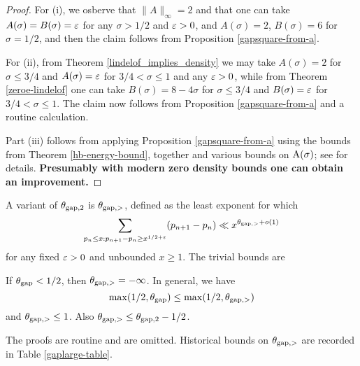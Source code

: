 \begin{proof} For (i), we osberve that $\|A\|_\infty=2$ and that one can take $A(\sigma)=B(\sigma)=\varepsilon$ for any $\sigma>1/2$ and $\varepsilon>0$, and $A(\sigma)=2$, $B(\sigma)=6$ for $\sigma=1/2$, and then the claim follows from Proposition \ref{gapsquare-from-a}.

For (ii), from Theorem \ref{lindelof_implies_density} we may take $A(\sigma)=2$ for $\sigma \leq 3/4$ and $A(\sigma)=\varepsilon$ for $3/4 < \sigma \leq 1$ and any $\varepsilon>0$, while from Theorem \ref{zeroe-lindelof} one can take $B(\sigma) = 8-4\sigma$ for $\sigma \leq 3/4$ and $B(\sigma)=\varepsilon$ for $3/4 < \sigma \leq 1$.  The claim now follows from Proposition \ref{gapsquare-from-a} and a routine calculation.

Part (iii) follows from applying Proposition \ref{gapsquare-from-a} using the bounds from Theorem \ref{hb-energy-bound}, together and various bounds on $\mathrm{A}(\sigma)$; see \cite[Theorem 12.14]{ivic} for details.  {\bf Presumably with modern zero density bounds one can obtain an improvement.}
\end{proof}

A variant of $\theta_{\mathrm{gap},2}$ is $\theta_{\mathrm{gap},>}$, defined as the least exponent for which
$$ \sum_{p_n \leq x: p_{n+1}-p_n \geq x^{1/2+\varepsilon}} (p_{n+1}-p_n) \ll x^{\theta_{\mathrm{gap},>}+o(1)}$$
for any fixed $\varepsilon>0$ and unbounded $x \geq 1$.  The trivial bounds are

\begin{proposition}\label{trivial-large-gap}  If $\theta_{\mathrm{gap}} < 1/2$, then $\theta_{\mathrm{gap},>} = -\infty$.  In general, we have
    $$ \max(1/2,\theta_{\mathrm{gap}}) \leq \max(1/2, \theta_{\mathrm{gap},>})$$
    and $\theta_{\mathrm{gap},>} \leq 1$.  Also $\theta_{\mathrm{gap},>} \leq \theta_{\mathrm{gap},2} - 1/2$.
\end{proposition}

The proofs are routine and are omitted.  Historical bounds on $\theta_{\mathrm{gap},>}$ are recorded in Table \ref{gaplarge-table}.


